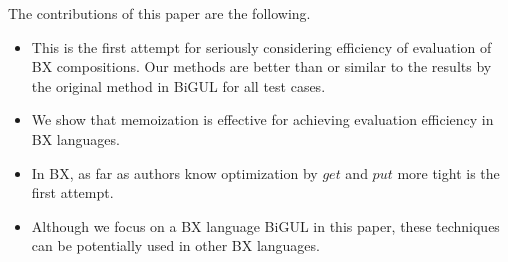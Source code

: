 The contributions of this paper are the following.

\begin{itemize}
\item This is the first attempt for seriously considering efficiency of evaluation of BX compositions. Our methods are better than or similar to the results by the original method in BiGUL for all test cases.
\item We show that memoization is effective for achieving evaluation efficiency in BX languages.
\item In BX, as far as authors know optimization by $get$ and $put$ more tight is the first attempt.
\item Although we focus on a BX language BiGUL in this paper, these techniques can be potentially used in other BX languages.
\end{itemize}

